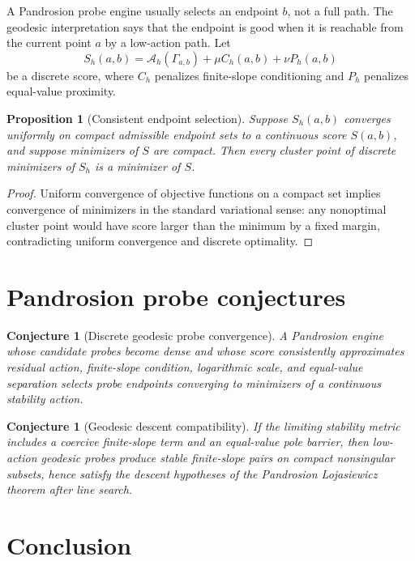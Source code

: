 \documentclass[11pt]{article}
\newtheorem{proposition}[definition]{Proposition}
\newtheorem{conjecture}[definition]{Conjecture}
\newcommand{\A}{\mathcal A}
\begin{document}
A Pandrosion probe engine usually selects an endpoint \(b\), not a full path. The geodesic interpretation says that the endpoint is good when it is reachable from the current point \(a\) by a low-action path. Let
\[
        S_h(a,b)=\A_h(\Gamma_{a,b})+\mu C_h(a,b)+\nu P_h(a,b)
\]
be a discrete score, where \(C_h\) penalizes finite-slope conditioning and \(P_h\) penalizes equal-value proximity.

\begin{proposition}[Consistent endpoint selection]\label{prop:endpoint}
Suppose \(S_h(a,b)\) converges uniformly on compact admissible endpoint sets to a continuous score \(S(a,b)\), and suppose minimizers of \(S\) are compact. Then every cluster point of discrete minimizers of \(S_h\) is a minimizer of \(S\).
\end{proposition}

\begin{proof}
Uniform convergence of objective functions on a compact set implies convergence of minimizers in the standard variational sense: any nonoptimal cluster point would have score larger than the minimum by a fixed margin, contradicting uniform convergence and discrete optimality.
\end{proof}

\section{Pandrosion probe conjectures}

\begin{conjecture}[Discrete geodesic probe convergence]
A Pandrosion engine whose candidate probes become dense and whose score consistently approximates residual action, finite-slope condition, logarithmic scale, and equal-value separation selects probe endpoints converging to minimizers of a continuous stability action.
\end{conjecture}

\begin{conjecture}[Geodesic descent compatibility]
If the limiting stability metric includes a coercive finite-slope term and an equal-value pole barrier, then low-action geodesic probes produce stable finite-slope pairs on compact nonsingular subsets, hence satisfy the descent hypotheses of the Pandrosion Lojasiewicz theorem after line search.
\end{conjecture}

\section{Conclusion}
\end{document}
